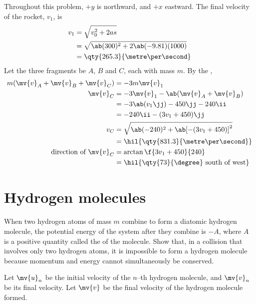 Throughout this problem, \(+y\) is northward, and \(+x\) eastward.
The final velocity of the rocket, \({v}_1\), is
\begin{align*}
	{v}_1 & = \sqrt{{v}_0^2 + 2{a}{s}}              \\
	      & = \sqrt{\ab(300)^2 + 2\ab(-9.81)(1000)} \\
	      & = \qty{265.3}{\metre\per\second}
\end{align*}
Let the three fragments be \(A\), \(B\) and \(C\), each with mass
\(m\). By the ,
\begin{align*}
	m(\mv{v}_A + \mv{v}_B + \mv{v}_C) & = -3m\mv{v}_1                                  \\
	\mv{v}_C                          & = -3\mv{v}_1 - \ab(\mv{v}_A + \mv{v}_B)        \\
	                                  & = -3\ab(v_1\jj) - 450\jj - 240\ii              \\
	                                  & = -240\ii - (3v_1 + 450)\jj                    \\
	{v}_C                             & = \sqrt{\ab(-240)^2 + \ab[-(3v_1+450)]^2}      \\
	                                  & = \hil{\qty{831.3}{\metre\per\second}}         \\
	\text{direction of } \mv{v}_C     & = \arctan\f{3v_1 +450}{240}                    \\
	                                  & = \hil{\qty{73}{\degree}\text{ south of west}}
\end{align*}

\section{Hydrogen molecules}
\begin{problem}
When two hydrogen atoms of mass \(m\) combine to form a diatomic
hydrogen molecule,
the potential energy of the system after they combine is \(-A\),
where \(A\) is a positive quantity called the
 of the molecule.
Show that, in a collision that involves only two hydrogen atoms, it
is impossible to form a hydrogen molecule because momentum and energy
cannot simultaneously be conserved.
\end{problem}

Let \(\mv{u}_n\) be the initial velocity of the \(n\)--th hydrogen
molecule, and
\(\mv{v}_n\) be its final velocity. Let \(\mv{v}\) be the final
velocity of the
hydrogen molecule formed.

